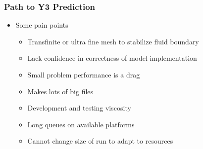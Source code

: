 \begin{frame}\frametitle{Path to Y3 Prediction}
\begin{multicols}{2}
\begin{itemize}
\item Some pain points
  \begin{itemize}
  \item Transfinite or ultra fine mesh to stabilize fluid boundary
  \item Lack confidence in correctness of model implementation
  \item Small problem performance is a drag
  \item Makes lots of big files
  \item Development and testing viscosity
  \item Long queues on available platforms
  \item Cannot change size of run to adapt to resources
  \end{itemize}
\end{itemize}
\end{multicols}
\end{frame}


